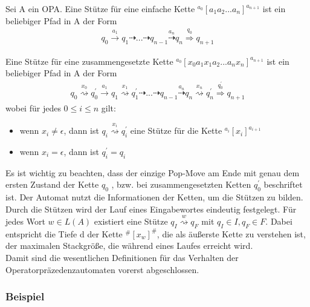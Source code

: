 \begin{definition}[Stützen]
\label{Support}
Sei A ein OPA. Eine Stütze für eine einfache Kette $^{a_0} \left[ a_1a_2...a_n\right]^{a_{n+1}}$ ist ein beliebiger Pfad in A der Form 
\begin{eqnarray}
q_0  \stackrel{a_1}{\rightarrow} q_1 \dashrightarrow ... \dashrightarrow q_{n-1} \stackrel{a_n}{\dashrightarrow} q_n \stackrel {q_0} {\Rightarrow} q_{n+1}
\label{simpSupport}
\end{eqnarray}

Eine Stütze für eine zusammengesetzte Kette $^{a_0}\left[x_0a_1x_1a_2...a_nx_n\right]^{a_{n+1}}$ ist ein beliebiger Pfad in A der Form
\begin{eqnarray}
q_0 \stackrel{x_0}{\rightsquigarrow} q_0^{\prime} \stackrel{a_1}{\rightarrow} q_1\stackrel{x_1}{\rightsquigarrow} q_1^{\prime} \dashrightarrow ... \dashrightarrow q_{n-1} \stackrel{a_n}{\dashrightarrow} q_n \stackrel{x_n}{\rightsquigarrow} q_n^{\prime} \stackrel {q_0^{\prime}} {\Rightarrow} q_{n+1}
\label{compSupport}
\end{eqnarray}
wobei für jedes $0\leq i \leq n$ gilt: 
\begin{itemize}
\item wenn $x_i \neq \epsilon$, dann ist $q_i \stackrel{x_i}{\rightsquigarrow} q_i^{\prime}$ eine Stütze für die Kette $^{a_i}\left[x_i\right]^{a_{i+1}}$
\item wenn $x_i = \epsilon$, dann ist $q_i^{\prime}=q_i$
\end{itemize}

\end{definition}

Es ist wichtig zu beachten, dass der einzige Pop-Move am Ende mit genau dem ersten Zustand der Kette $q_0$ , bzw. bei zusammengesetzten Ketten $q_0^{\prime}$ beschriftet ist. Der Automat nutzt die Informationen der Ketten, um die Stützen zu bilden. Durch die Stützen wird der Lauf eines Eingabewortes eindeutig festgelegt. Für jedes Wort $w \in L(A)$ existiert eine Stütze $q_I  \stackrel{w}{\rightsquigarrow} q_F$ mit $q_I \in I, q_F \in F$.  Dabei entspricht die Tiefe d der Kette $^\#\left[x_w\right]^\#$, die als äußerste Kette zu verstehen ist, der maximalen Stackgröße, die während eines Laufes erreicht wird.\\
Damit sind die wesentlichen Definitionen für das Verhalten der Operatorpräzedenzautomaten vorerst abgeschlossen. 
\subsubsection{Beispiel}

